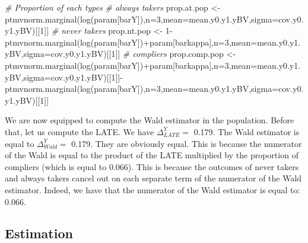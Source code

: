 \documentclass[
]{book}
\newenvironment{Shaded}{\begin{snugshade}}{\end{snugshade}}
\newcommand{\AttributeTok}[1]{\textcolor[rgb]{0.77,0.63,0.00}{#1}}
\newcommand{\CommentTok}[1]{\textcolor[rgb]{0.56,0.35,0.01}{\textit{#1}}}
\newcommand{\DecValTok}[1]{\textcolor[rgb]{0.00,0.00,0.81}{#1}}
\newcommand{\FunctionTok}[1]{\textcolor[rgb]{0.00,0.00,0.00}{#1}}
\newcommand{\NormalTok}[1]{#1}
\newcommand{\OtherTok}[1]{\textcolor[rgb]{0.56,0.35,0.01}{#1}}
\newcommand{\SpecialCharTok}[1]{\textcolor[rgb]{0.00,0.00,0.00}{#1}}
\newcommand{\StringTok}[1]{\textcolor[rgb]{0.31,0.60,0.02}{#1}}
\theoremstyle{definition}
\theoremstyle{definition}
\theoremstyle{definition}
\theoremstyle{definition}
\theoremstyle{remark}
\begin{document}
\begin{Shaded}
\begin{Highlighting}[]
\CommentTok{\# Proportion of each types}
\CommentTok{\# always takers}
\NormalTok{prop.at.pop }\OtherTok{\textless{}{-}} \FunctionTok{ptmvnorm.marginal}\NormalTok{(}\FunctionTok{log}\NormalTok{(param[}\StringTok{\textquotesingle{}barY\textquotesingle{}}\NormalTok{]),}\AttributeTok{n=}\DecValTok{3}\NormalTok{,}\AttributeTok{mean=}\NormalTok{mean.y0.y1.yBV,}\AttributeTok{sigma=}\NormalTok{cov.y0.y1.yBV)[[}\DecValTok{1}\NormalTok{]]}
\CommentTok{\# never takers}
\NormalTok{prop.nt.pop }\OtherTok{\textless{}{-}} \DecValTok{1}\SpecialCharTok{{-}}\FunctionTok{ptmvnorm.marginal}\NormalTok{(}\FunctionTok{log}\NormalTok{(param[}\StringTok{\textquotesingle{}barY\textquotesingle{}}\NormalTok{])}\SpecialCharTok{+}\NormalTok{param[}\StringTok{\textquotesingle{}barkappa\textquotesingle{}}\NormalTok{],}\AttributeTok{n=}\DecValTok{3}\NormalTok{,}\AttributeTok{mean=}\NormalTok{mean.y0.y1.yBV,}\AttributeTok{sigma=}\NormalTok{cov.y0.y1.yBV)[[}\DecValTok{1}\NormalTok{]]}
\CommentTok{\# compliers}
\NormalTok{prop.comp.pop }\OtherTok{\textless{}{-}} \FunctionTok{ptmvnorm.marginal}\NormalTok{(}\FunctionTok{log}\NormalTok{(param[}\StringTok{\textquotesingle{}barY\textquotesingle{}}\NormalTok{])}\SpecialCharTok{+}\NormalTok{param[}\StringTok{\textquotesingle{}barkappa\textquotesingle{}}\NormalTok{],}\AttributeTok{n=}\DecValTok{3}\NormalTok{,}\AttributeTok{mean=}\NormalTok{mean.y0.y1.yBV,}\AttributeTok{sigma=}\NormalTok{cov.y0.y1.yBV)[[}\DecValTok{1}\NormalTok{]]}\SpecialCharTok{{-}}\FunctionTok{ptmvnorm.marginal}\NormalTok{(}\FunctionTok{log}\NormalTok{(param[}\StringTok{\textquotesingle{}barY\textquotesingle{}}\NormalTok{]),}\AttributeTok{n=}\DecValTok{3}\NormalTok{,}\AttributeTok{mean=}\NormalTok{mean.y0.y1.yBV,}\AttributeTok{sigma=}\NormalTok{cov.y0.y1.yBV)[[}\DecValTok{1}\NormalTok{]]}
\end{Highlighting}
\end{Shaded}

We are now equipped to compute the Wald estimator in the population.
Before that, let us compute the LATE.
We have \(\Delta^Y_{LATE} =\) 0.179.
The Wald estimator is equal to \(\Delta^Y_{Wald} =\) 0.179.
They are obviously equal.
This is because the numerator of the Wald is equal to the product of the LATE multiplied by the proportion of compliers (which is equal to 0.066).
This is because the outcomes of never takers and always takers cancel out on each separate term of the numerator of the Wald estimator.
Indeed, we have that the numerator of the Wald estimator is equal to: 0.066.

\hypertarget{estimation}{%
\subsection{Estimation}\label{estimation}}
\end{document}
